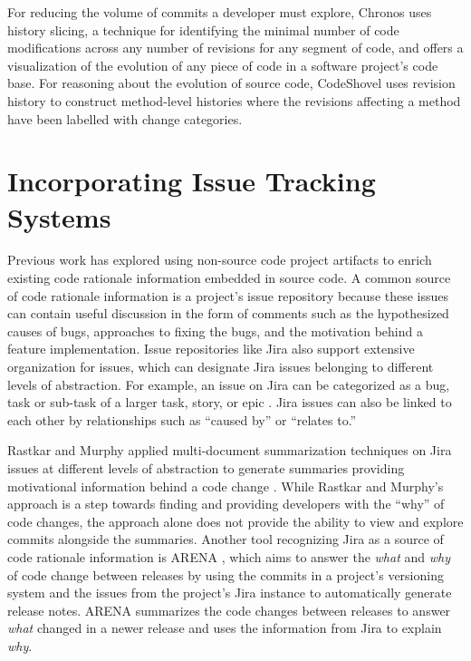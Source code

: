 For reducing the volume of commits a developer must explore, Chronos \cite{servant_history_2012} uses history slicing, a technique for identifying the minimal number of code modifications across any number of revisions for any segment of code, and offers a visualization of the evolution of any piece of code in a software project's code base.
For reasoning about the evolution of source code, CodeShovel \cite{grund_codeshovel_2021} uses revision history to construct method-level histories where the revisions affecting a method have been labelled with change categories.

\section{Incorporating Issue Tracking Systems}

Previous work has explored using non-source code project artifacts to enrich existing code rationale information embedded in source code. 
A common source of code rationale information is a project's issue repository because these issues can contain useful discussion in the form of comments such as the hypothesized causes of bugs, approaches to fixing the bugs, and the motivation behind a feature implementation. 
Issue repositories like Jira also support extensive organization for issues, which can designate Jira issues belonging to different levels of abstraction.
For example, an issue on Jira can be categorized as a bug, task or sub-task of a larger task, story, or epic \cite{jira-issue-types}.
Jira issues can also be linked to each other by relationships such as ``caused by'' or ``relates to.''

Rastkar and Murphy applied multi-document summarization techniques on Jira issues at different levels of abstraction to generate summaries providing motivational information behind a code change \cite{rastkar_why_2013}.
While Rastkar and Murphy's approach is a step towards finding and providing developers with the ``why'' of code changes, the approach alone does not provide the ability to view and explore commits alongside the summaries.
Another tool recognizing Jira as a source of code rationale information is ARENA \cite{moreno_arena_2017}, which aims to answer the \emph{what} and \emph{why} of code change between releases by using the commits in a project's versioning system and the issues from the project's Jira instance to automatically generate release notes. 
ARENA summarizes the code changes between releases to answer \emph{what} changed in a newer release and uses the information from Jira to explain \emph{why}.

